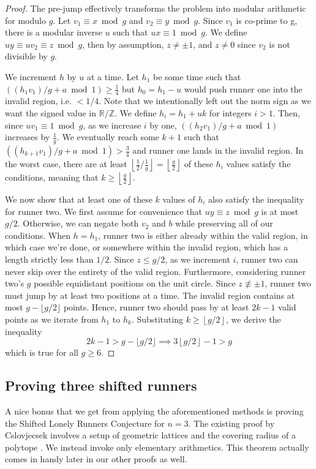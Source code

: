 \documentclass[11pt]{amsart}
\newcommand{\floor}[1]{\lfloor #1 \rfloor}
\newcommand{\Floor}[1]{\left\lfloor #1 \right\rfloor}
\begin{document}
\begin{proof}
    The pre-jump effectively transforms the problem into modular arithmetic for modulo $g$. Let $v_1 \equiv x \bmod g$ and $v_2 \equiv y \bmod g$. Since $v_1$ is co-prime to g, there is a modular inverse $u$ such that $ux \equiv 1 \bmod g$. We define $uy \equiv uv_2 \equiv z \bmod g$, then by assumption, $z \neq \pm 1$, and $z \neq 0$ since $v_2$ is not divisible by $g$.

    We increment $h$ by $u$ at a time. Let $h_1$ be some time such that $\left((h_1v_1)/g + a \bmod 1 \right) \geq \frac{1}{4}$ but $h_0 = h_1 - u$ would push runner one into the invalid region, i.e. $< 1/4$. Note that we intentionally left out the norm sign as we want the signed value in $\mathbb{R}/\mathbb{Z}$. We define $h_i = h_1 + u k$ for integers $i > 1$. Then, since $u v_1 \equiv 1 \bmod g$, as we increase $i$ by one, $\left((h_2v_1)/g + a \bmod 1\right)$ increases by $\frac{1}{g}$. We eventually reach some $k + 1$ such that $\left((h_{k+1}v_1)/g + a \bmod 1 \right) > \frac{3}{4}$ and runner one lands in the invalid region. In the worst case, there are at least $\Floor{\frac{1}{2} / \frac{1}{g}} = \Floor{\frac{g}{2}}$ of these $h_i$ values satisfy the conditions, meaning that $k \geq \Floor{\frac{g}{2}}$. 
    
    We now show that at least one of these $k$ values of $h_i$ also satisfy the inequality for runner two. We first assume for convenience that $uy \equiv z \bmod g$ is at most $g / 2$. Otherwise, we can negate both $v_2$ and $b$ while preserving all of our conditions. When $h = h_1$, runner two is either already within the valid region, in which case we're done, or somewhere within the invalid region, which has a length strictly less than $1/2$. Since $z \leq g / 2$, as we increment $i$, runner two can never skip over the entirety of the valid region. Furthermore, considering runner two's $g$ possible equidistant positions on the unit circle. Since $z \not\equiv \pm 1$, runner two must jump by at least two positions at a time. The invalid region contains at most $g - \floor{g/2}$ points. Hence, runner two should pass by at least $2k - 1$ valid points as we iterate from $h_1$ to $h_k$. Substituting $k \geq \Floor{g / 2}$, we derive the inequality
    $$2k - 1 > g - \floor{g/2} \implies 3\Floor{g / 2} - 1 > g$$
    which is true for all $g \geq 6$.
\end{proof}

\subsection{Proving three shifted runners}
A nice bonus that we get from applying the aforementioned methods is proving the Shifted Lonely Runners Conjecture for $n=3$. The existing proof by Cslovjecsek involves a setup of geometric lattices and the covering radius of a polytope \cite{jana}. We instead invoke only elementary arithmetics. This theorem actually comes in handy later in our other proofs as well.
\end{document}
